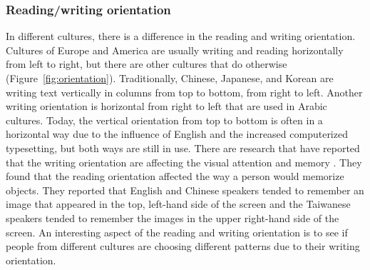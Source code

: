       \subsubsection*{Reading/writing orientation} 
      In different cultures, there is a difference in the reading and writing orientation. Cultures of Europe and America are usually writing and reading horizontally from left to right, but there are other cultures that do otherwise (Figure~\ref{fig:orientation}). Traditionally, Chinese, Japanese, and Korean are writing text vertically in columns from top to bottom, from right to left. Another writing orientation is horizontal from right to left that are used in Arabic cultures. Today, the vertical orientation from top to bottom is often in a horizontal way due to the influence of English and the increased computerized typesetting, but both ways are still in use. There are research that have reported that the writing orientation are affecting the visual attention and memory \cite{Chan}. They found that the reading orientation affected the way a person would memorize objects. They reported that English and Chinese speakers tended to remember an image that appeared in the top, left-hand side of the screen and the Taiwanese speakers tended to remember the images in the upper right-hand side of the screen. An interesting aspect of the reading and writing orientation is to see if people from different cultures are choosing different patterns due to their writing orientation. 

